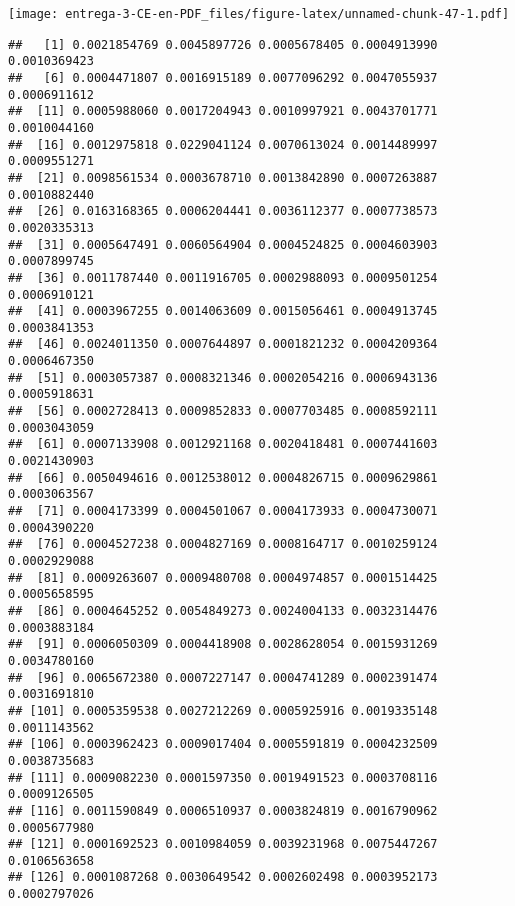 \documentclass[
]{article}
\newenvironment{Shaded}{\begin{snugshade}}{\end{snugshade}}
\newcommand{\DataTypeTok}[1]{\textcolor[rgb]{0.13,0.29,0.53}{#1}}
\newcommand{\DecValTok}[1]{\textcolor[rgb]{0.00,0.00,0.81}{#1}}
\newcommand{\KeywordTok}[1]{\textcolor[rgb]{0.13,0.29,0.53}{\textbf{#1}}}
\newcommand{\NormalTok}[1]{#1}
\newcommand{\OperatorTok}[1]{\textcolor[rgb]{0.81,0.36,0.00}{\textbf{#1}}}
\newcommand{\StringTok}[1]{\textcolor[rgb]{0.31,0.60,0.02}{#1}}
\begin{document}
\texttt{[image: entrega-3-CE-en-PDF\_files/figure-latex/unnamed-chunk-47-1.pdf]}

\begin{Shaded}
\end{Shaded}

\begin{verbatim}
##   [1] 0.0021854769 0.0045897726 0.0005678405 0.0004913990 0.0010369423
##   [6] 0.0004471807 0.0016915189 0.0077096292 0.0047055937 0.0006911612
##  [11] 0.0005988060 0.0017204943 0.0010997921 0.0043701771 0.0010044160
##  [16] 0.0012975818 0.0229041124 0.0070613024 0.0014489997 0.0009551271
##  [21] 0.0098561534 0.0003678710 0.0013842890 0.0007263887 0.0010882440
##  [26] 0.0163168365 0.0006204441 0.0036112377 0.0007738573 0.0020335313
##  [31] 0.0005647491 0.0060564904 0.0004524825 0.0004603903 0.0007899745
##  [36] 0.0011787440 0.0011916705 0.0002988093 0.0009501254 0.0006910121
##  [41] 0.0003967255 0.0014063609 0.0015056461 0.0004913745 0.0003841353
##  [46] 0.0024011350 0.0007644897 0.0001821232 0.0004209364 0.0006467350
##  [51] 0.0003057387 0.0008321346 0.0002054216 0.0006943136 0.0005918631
##  [56] 0.0002728413 0.0009852833 0.0007703485 0.0008592111 0.0003043059
##  [61] 0.0007133908 0.0012921168 0.0020418481 0.0007441603 0.0021430903
##  [66] 0.0050494616 0.0012538012 0.0004826715 0.0009629861 0.0003063567
##  [71] 0.0004173399 0.0004501067 0.0004173933 0.0004730071 0.0004390220
##  [76] 0.0004527238 0.0004827169 0.0008164717 0.0010259124 0.0002929088
##  [81] 0.0009263607 0.0009480708 0.0004974857 0.0001514425 0.0005658595
##  [86] 0.0004645252 0.0054849273 0.0024004133 0.0032314476 0.0003883184
##  [91] 0.0006050309 0.0004418908 0.0028628054 0.0015931269 0.0034780160
##  [96] 0.0065672380 0.0007227147 0.0004741289 0.0002391474 0.0031691810
## [101] 0.0005359538 0.0027212269 0.0005925916 0.0019335148 0.0011143562
## [106] 0.0003962423 0.0009017404 0.0005591819 0.0004232509 0.0038735683
## [111] 0.0009082230 0.0001597350 0.0019491523 0.0003708116 0.0009126505
## [116] 0.0011590849 0.0006510937 0.0003824819 0.0016790962 0.0005677980
## [121] 0.0001692523 0.0010984059 0.0039231968 0.0075447267 0.0106563658
## [126] 0.0001087268 0.0030649542 0.0002602498 0.0003952173 0.0002797026

\end{verbatim}
\end{document}
